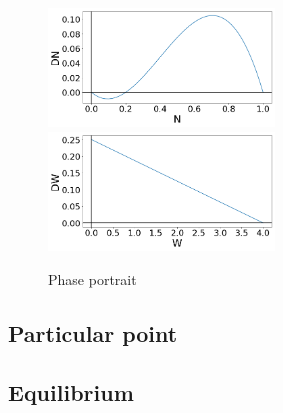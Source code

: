 \documentclass{article}
\begin{document}
\begin{figure}[h!]
\centering
\includegraphics[width=6cm]{phase_N.png}
\includegraphics[width=6cm]{phase_W.png}
\caption{Phase portrait}
\end{figure}





\subsection{Particular point}
\label{equi}

\subsection{Equilibrium}
\end{document}
